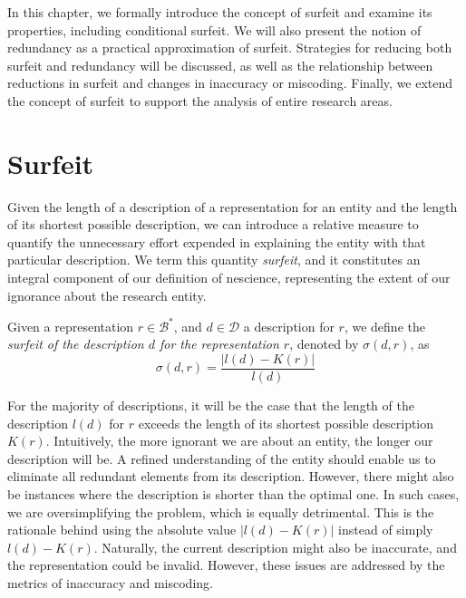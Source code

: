 In this chapter, we formally introduce the concept of surfeit and examine its properties, including conditional surfeit. We will also present the notion of redundancy as a practical approximation of surfeit. Strategies for reducing both surfeit and redundancy will be discussed, as well as the relationship between reductions in surfeit and changes in inaccuracy or miscoding. Finally, we extend the concept of surfeit to support the analysis of entire research areas.

%
%

\section{Surfeit}
\label{sec:Definition_redundancy}

Given the length of a description of a representation for an entity and the length of its shortest possible description, we can introduce a relative measure to quantify the unnecessary effort expended in explaining the entity with that particular description. We term this quantity \emph{surfeit}, and it constitutes an integral component of our definition of nescience, representing the extent of our ignorance about the research entity.

\begin{definition}[Surfeit]
Given a representation $r \in \mathcal{B}^\ast$, and $d \in \mathcal{D}$ a description for $r$, we define the \emph{surfeit of the description $d$ for the representation $r$}, denoted by $\sigma(d, r)$, as
\[
\sigma (d, r) = \frac{ | l(d) - K(r) |}{l(d)}
\]
\end{definition}

For the majority of descriptions, it will be the case that the length of the description $l(d)$ for $r$ exceeds the length of its shortest possible description $K(r)$. Intuitively, the more ignorant we are about an entity, the longer our description will be. A refined understanding of the entity should enable us to eliminate all redundant elements from its description. However, there might also be instances where the description is shorter than the optimal one. In such cases, we are oversimplifying the problem, which is equally detrimental. This is the rationale behind using the absolute value $| l(d) - K(r) |$ instead of simply $l(d) - K(r)$. Naturally, the current description might also be inaccurate, and the representation could be invalid. However, these issues are addressed by the metrics of inaccuracy and miscoding.


